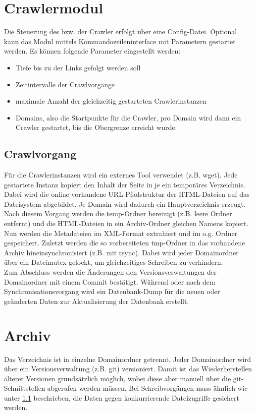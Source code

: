 \section{Crawlermodul}
Die Steuerung des bzw. der Crawler erfolgt über eine Config-Datei. 
Optional kann das Modul mittels Kommandozeileninterface mit Parametern gestartet werden.
Es können folgende Parameter eingestellt werden:
\begin{itemize}
	\item Tiefe bis zu der Links gefolgt werden soll
	\item Zeitintervalle der Crawlvorgänge
	\item maximale Anzahl der gleichzeitig gestarteten Crawlerinstanzen
	\item Domains, also die Startpunkte für die Crawler, pro Domain wird dann ein Crawler gestartet,
		bis die Obergrenze erreicht wurde.
\end{itemize}

\subsection{Crawlvorgang} \label{l:spez:crawler}
Für die Crawlerinstanzen wird ein externes Tool verwendet (z.B. wget).
Jede gestartete Instanz kopiert den Inhalt der Seite in je ein temporäres Verzeichnis.
Dabei wird die online vorhandene URL-Pfadstruktur der HTML-Dateien auf das Dateisystem abgebildet.
Je Domain wird dadurch ein Hauptverzeichnis erzeugt. \\
Nach diesem Vorgang werden die temp-Ordner bereinigt (z.B. leere Ordner entfernt)
und die HTML-Dateien in ein Archiv-Ordner gleichen Namens kopiert.
Nun werden die Metadateien im XML-Format extrahiert und im o.g. Ordner gespeichert.
Zuletzt werden die so vorbereiteten tmp-Ordner in das vorhandene Archiv hineinsynchronisiert (z.B. mit rsync). 
Dabei wird jeder Domainordner über ein Dateimutex gelockt, um
gleichzeitiges Schreiben zu verhindern. \\
Zum Abschluss werden die Änderungen den Versionsverwaltungen der Domainordner mit einem Commit bestätigt.
Während oder nach dem Synchronisationsvorgang wird ein Datenbank-Dump für die neuen oder geänderten Daten
zur Aktualisierung der Datenbank erstellt.

\section{Archiv}
Das Verzeichnis ist in einzelne Domainordner getrennt. Jeder Domainordner wird über ein Versionsverwaltung
(z.B. git) versioniert. Damit ist das Wiederherstellen älterer Versionen grundsätzlich möglich,
wobei diese aber manuell über die git-Schnittstellen abgerufen werden müssen.
Bei Schreibvorgängen muss ähnlich wie unter \ref{l:spez:crawler} beschrieben, 
die Daten gegen konkurrierende Dateizugriffe gesichert werden.
